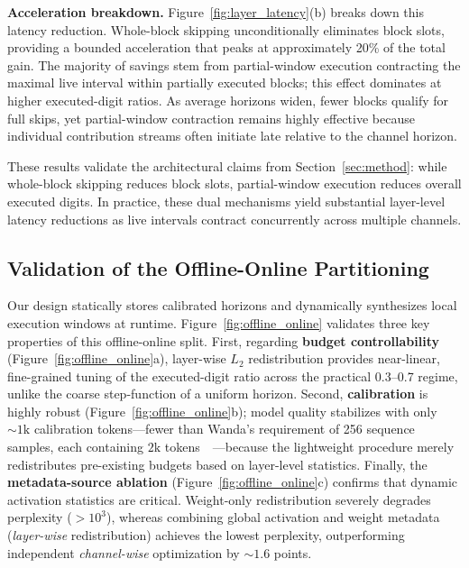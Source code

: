 \documentclass[sigconf]{acmart}
\begin{document}
\textbf{Acceleration breakdown.}
Figure~\ref{fig:layer_latency}(b) breaks down this latency reduction. Whole-block skipping unconditionally eliminates block slots, providing a bounded acceleration that peaks at approximately 20\% of the total gain. The majority of savings stem from partial-window execution contracting the maximal live interval within partially executed blocks; this effect dominates at higher executed-digit ratios. As average horizons widen, fewer blocks qualify for full skips, yet partial-window contraction remains highly effective because individual contribution streams often initiate late relative to the channel horizon.

These results validate the architectural claims from Section~\ref{sec:method}: while whole-block skipping reduces block slots, partial-window execution reduces overall executed digits. In practice, these dual mechanisms yield substantial layer-level latency reductions as live intervals contract concurrently across multiple channels.

\subsection{Validation of the Offline-Online Partitioning}
\label{sec:offline_online}

Our design statically stores calibrated horizons and dynamically synthesizes local execution windows at runtime. Figure~\ref{fig:offline_online} validates three key properties of this offline-online split. First, regarding \textbf{budget controllability} (Figure~\ref{fig:offline_online}a), layer-wise $L_2$ redistribution provides near-linear, fine-grained tuning of the executed-digit ratio across the practical 0.3--0.7 regime, unlike the coarse step-function of a uniform horizon. Second, \textbf{calibration} is highly robust (Figure~\ref{fig:offline_online}b); model quality stabilizes with only ${\sim}1\text{k}$ calibration tokens---fewer than Wanda's requirement of 256 sequence samples, each containing $2\text{k}$ tokens~~\cite{sun2023simple}---because the lightweight procedure merely redistributes pre-existing budgets based on layer-level statistics. Finally, the \textbf{metadata-source ablation} (Figure~\ref{fig:offline_online}c) confirms that dynamic activation statistics are critical. Weight-only redistribution severely degrades perplexity ($>10^3$), whereas combining global activation and weight metadata (\emph{layer-wise} redistribution) achieves the lowest perplexity, outperforming independent \emph{channel-wise} optimization by ${\sim}1.6$ points.
\end{document}
